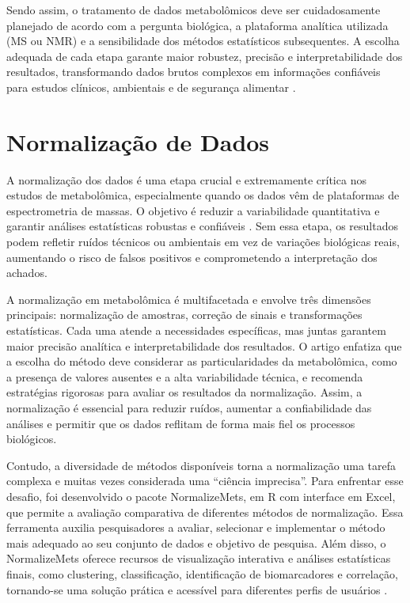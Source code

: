 Sendo assim, o tratamento de dados metabolômicos deve ser cuidadosamente planejado de acordo com a pergunta biológica, a plataforma analítica utilizada (MS ou NMR) e a sensibilidade dos métodos estatísticos subsequentes. A escolha adequada de cada etapa garante maior robustez, precisão e interpretabilidade dos resultados, transformando dados brutos complexos em informações confiáveis para estudos clínicos, ambientais e de segurança alimentar \cite{picone2026integrating}.

\section{\textbf{Normalização de Dados}}

A normalização dos dados é uma etapa crucial e extremamente crítica nos estudos de metabolômica, especialmente quando os dados vêm de plataformas de espectrometria de massas. O objetivo é reduzir a variabilidade quantitativa e garantir análises estatísticas robustas e confiáveis \cite{low2026multifaceted}. Sem essa etapa, os resultados podem refletir ruídos técnicos ou ambientais em vez de variações biológicas reais, aumentando o risco de falsos positivos e comprometendo a interpretação dos achados.

A normalização em metabolômica é multifacetada e envolve três dimensões principais: normalização de amostras, correção de sinais e transformações estatísticas. Cada uma atende a necessidades específicas, mas juntas garantem maior precisão analítica e interpretabilidade dos resultados. O artigo \cite{low2026multifaceted} enfatiza que a escolha do método deve considerar as particularidades da metabolômica, como a presença de valores ausentes e a alta variabilidade técnica, e recomenda estratégias rigorosas para avaliar os resultados da normalização. Assim, a normalização é essencial para reduzir ruídos, aumentar a confiabilidade das análises e permitir que os dados reflitam de forma mais fiel os processos biológicos.

Contudo, a diversidade de métodos disponíveis torna a normalização uma tarefa complexa e muitas vezes considerada uma “ciência imprecisa”. Para enfrentar esse desafio, foi desenvolvido o pacote NormalizeMets, em R com interface em Excel, que permite a avaliação comparativa de diferentes métodos de normalização. Essa ferramenta auxilia pesquisadores a avaliar, selecionar e implementar o método mais adequado ao seu conjunto de dados e objetivo de pesquisa. Além disso, o NormalizeMets oferece recursos de visualização interativa e análises estatísticas finais, como clustering, classificação, identificação de biomarcadores e correlação, tornando-se uma solução prática e acessível para diferentes perfis de usuários \cite{de2018normalizemets}.

